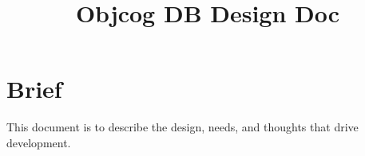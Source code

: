 \documentclass[10pt,a4paper]{article}
\title{Objcog DB Design Doc}
\begin{document}
\section{Brief}
This document is to describe the design, needs, and thoughts that drive development.

\end{document}
